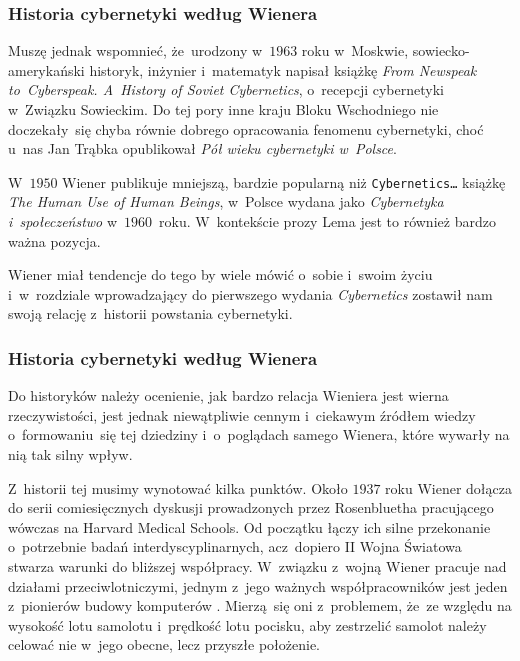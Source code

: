 \documentclass[10pt,t]{beamer}
\begin{document}
\begin{frame}
  \frametitle{Historia cybernetyki według Wienera}


  Muszę jednak wspomnieć, że~urodzony w~$1963$ roku w~Moskwie,
  sowiecko-amerykański historyk, inżynier i~matematyk
  napisał książkę
  {\textit{From Newspeak to~Cyberspeak. A~History of Soviet Cybernetics}},
  o~recepcji cybernetyki w~Związku Sowieckim. Do tej pory inne kraju
  Bloku Wschodniego nie doczekały~się chyba równie dobrego opracowania
  fenomenu cybernetyki, choć u~nas Jan Trąbka opublikował
  \textit{Pół wieku cybernetyki w~Polsce}.

  W~$1950$ Wiener publikuje mniejszą, bardzie
  popularną niż \texttt{Cybernetics\ldots} książkę
  {\textit{The Human Use of Human Beings}}, w~Polsce wydana jako
  \textit{Cybernetyka i~społeczeństwo} w~$1960$~roku. W~kontekście prozy
  Lema jest to również bardzo ważna pozycja.

  Wiener miał tendencje do tego by wiele mówić o~sobie i~swoim
  życiu i~w~rozdziale wprowadzający do pierwszego wydania
  \textit{Cybernetics} zostawił nam swoją relację z~historii powstania
  cybernetyki.

\end{frame}





\begin{frame}
  \frametitle{Historia cybernetyki według Wienera}


  Do historyków należy ocenienie, jak bardzo relacja
  Wieniera jest wierna rzeczywistości, jest jednak niewątpliwie cennym
  i~ciekawym źródłem wiedzy o~formowaniu~się tej dziedziny i~o~poglądach
  samego Wienera, które wywarły na nią tak silny wpływ.

  Z~historii tej musimy wynotować kilka punktów. Około $1937$ roku
  Wiener dołącza do serii comiesięcznych dyskusji prowadzonych przez
  Rosenbluetha pracującego wówczas na Harvard Medical Schools. Od początku
  łączy ich silne przekonanie o~potrzebnie badań interdyscyplinarnych,
  acz~dopiero II Wojna Światowa stwarza warunki do bliższej współpracy.
  W~związku z~wojną Wiener pracuje nad działami przeciwlotniczymi, jednym
  z~jego ważnych współpracowników jest jeden z~pionierów budowy komputerów
  . Mierzą~się oni z~problemem, że~ze względu na wysokość lotu
  samolotu i~prędkość lotu pocisku, aby zestrzelić samolot należy celować
  nie w~jego obecne, lecz przyszłe położenie.

\end{frame}
\end{document}
